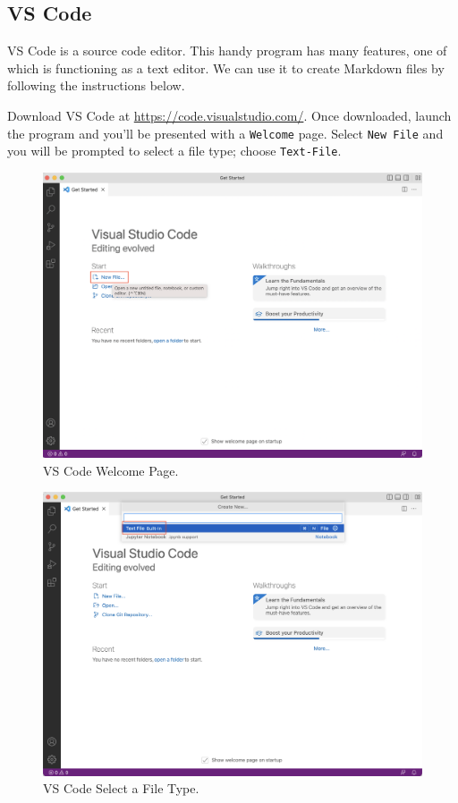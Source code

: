 \documentclass[
]{book}
\begin{document}
\hypertarget{vs-code}{%
\subsection*{VS Code}\label{vs-code}}

VS Code is a source code editor. This handy program has many features, one of which is functioning as a text editor. We can use it to create Markdown files by following the instructions below.

Download VS Code at \url{https://code.visualstudio.com/}. Once downloaded, launch the program and you'll be presented with a \texttt{Welcome} page. Select \texttt{New\ File} and you will be prompted to select a file type; choose \texttt{Text-File}.

\begin{figure}
\centering
\includegraphics{images/vs-code-1.png}
\caption{VS Code Welcome Page.}
\end{figure}

\begin{figure}
\centering
\includegraphics{images/vs-code-2.png}
\caption{VS Code Select a File Type.}
\end{figure}
\end{document}
